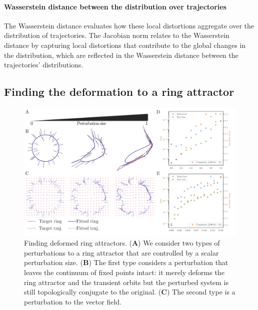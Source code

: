 \documentclass{article}
\theoremstyle{definition} \newtheorem{definition}{Definition}  \newtheorem{example}{Example}
\theoremstyle{remark} \newtheorem{remark}{Remark}
\newcounter{ct}
\begin{document}

\paragraph{Wasserstein distance between the distribution over trajectories}
\citep{bion2019wasserstein}
The Wasserstein distance evaluates how these local distortions aggregate over the distribution of trajectories.
The Jacobian norm relates to the Wasserstein distance by capturing local distortions that contribute to the global changes in the distribution, which are reflected in the Wasserstein distance between the trajectories' distributions.





\subsection{Finding the deformation to a ring attractor}
\begin{figure}[htbp]
    \centering
    \includegraphics[width=.9\linewidth]{ring_pert_fig}
    \caption{Finding deformed ring attractors. 
    (\textbf{A}) We consider two types of perturbations to a ring attractor that are controlled by a scalar perturbation size.
    (\textbf{B}) The first type considers a perturbation that leaves the continuum of fixed points intact: it merely deforms the ring attractor and the transient orbits but the perturbed system is still topologically conjugate to the original.
    (\textbf{C}) The second type is a perturbation to the vector field. 
    }
    \label{fig:ring_pert_fig}
\end{figure}
\end{document}
